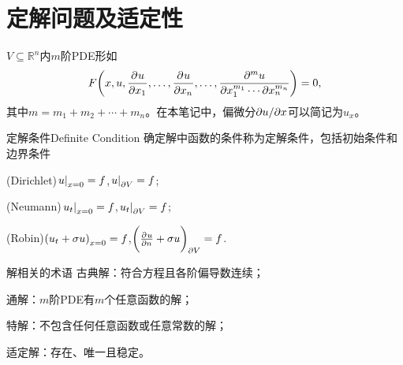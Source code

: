 \section{定解问题及适定性}
$V\subseteq\mathbb R^n$内$m$阶PDE形如
\[
	F\biggl(x,u,\frac{\partial^{{}}u}{\partial{x_1}^{{}}},\ldots,\frac{\partial^{{}}u}{\partial{x_n}^{{}}},\ldots,\frac{\partial^mu}{\partial x_1^{m_1}\cdots\partial x_n^{m_n}}\biggr)=0,
\]
其中$m=m_1+m_2+\cdots+m_n$。在本笔记中，偏微分$\partial u/\partial x$可以简记为$u_x$。
\begin{definition}{定解条件}{Definite Condition}
	确定解中函数的条件称为定解条件，包括初始条件和边界条件
	\begin{compactenum}[I.]
		\item (Dirichlet)\quad$\left.u\right\rvert_{x=0}=f$,\qqqquad$\left.u\right\rvert_{\partial V}=f$;
		\item (Neumann)\enspace$\left.u_t\right\rvert_{x=0}=f$,\qqqquad\!$\left.u_t\right\rvert_{\partial V}=f$;
		\item (Robin)\qquad$\left(u_t+\sigma u\right)_{x=0}=f$,\quad$\biggl(\frac{\partial^{{}}u}{\partial{n}^{{}}}+\sigma u\biggr)_{\partial V}=f$.
	\end{compactenum}
\end{definition}
\begin{definition}{解相关的术语}{}
	古典解：符合方程且各阶偏导数连续；

	通解：$m$阶PDE有$m$个任意函数的解；

	特解：不包含任何任意函数或任意常数的解；

	适定解：存在、唯一且稳定。
\end{definition}
